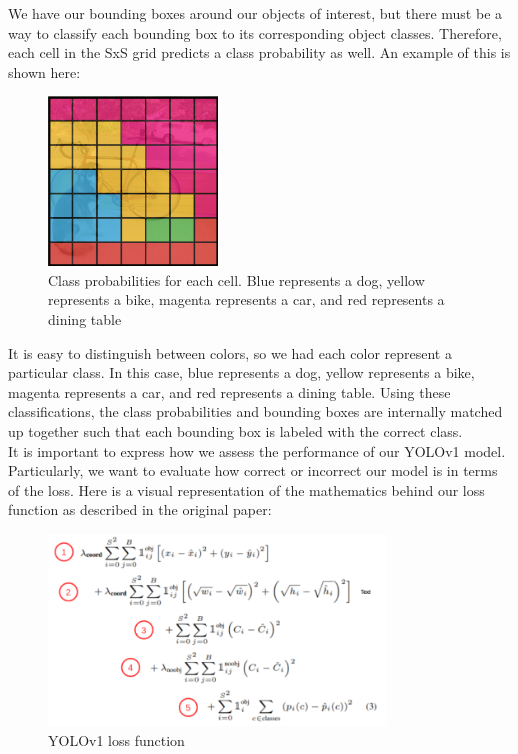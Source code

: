 \documentclass{article}
\begin{document}
We have our bounding boxes around our objects of interest, but there must be a way to classify each bounding box to its corresponding object classes. Therefore, each cell in the SxS grid predicts a class probability as well. An example of this is shown here:

\begin{figure}[H]
  \centering
  \includegraphics[width=0.4\textwidth]{Images/Grid_class.png}
  \caption{Class probabilities for each cell. Blue represents a dog, yellow represents a bike, magenta represents a car, and red represents a dining table}
  \label{fig:example}
\end{figure}

It is easy to distinguish between colors, so we had each color represent a particular class. In this case, blue represents a dog, yellow represents a bike, magenta represents a car, and red represents a dining table. Using these classifications, the class probabilities and bounding boxes are internally matched up together such that each bounding box is labeled with the correct class. \\

It is important to express how we assess the performance of our YOLOv1 model. Particularly, we want to evaluate how correct or incorrect our model is in terms of the loss. Here is a visual representation of the mathematics behind our loss function as described in the original paper:

\begin{figure}[H]
  \centering
  \includegraphics[width=0.8\textwidth]{Images/loss.png}
  \caption{YOLOv1 loss function}
  \label{fig:example}
\end{figure}
\end{document}
